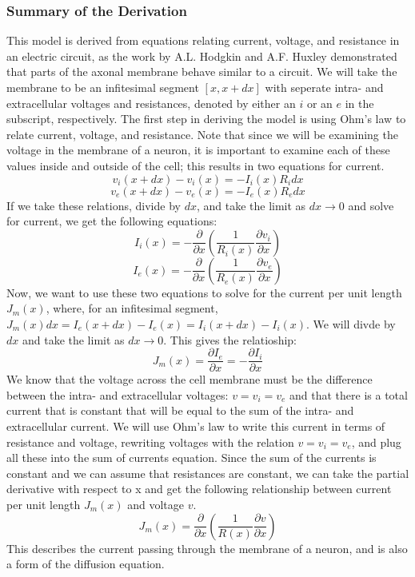 \documentclass[12pt]{article}
\begin{document}
\subsubsection{Summary of the Derivation}
This model is derived from equations relating current, voltage, and resistance in an electric circuit, as the work by A.L. Hodgkin and A.F. Huxley demonstrated that parts of the axonal membrane behave similar to a circuit. We will take the membrane to be an infitesimal segment $[x, x+dx]$ with seperate intra- and extracellular voltages and resistances, denoted by either an $i$ or an $e$ in the subscript, respectively. The first step in deriving the model is using Ohm's law to relate current, voltage, and resistance. Note that since we will be examining the voltage in the membrane of a neuron, it is important to examine each of these values inside and outside of the cell; this results in two equations for current. 
\[v_i(x+dx)-v_i(x)=-I_i(x)R_idx\]
\[v_e(x+dx)-v_e(x)=-I_e(x)R_edx\]
If we take these relations, divide by $dx$, and take the limit as $dx\rightarrow 0$ and solve for current, we get the following equations:
\[I_i(x)=-\frac{\partial}{\partial{x}}(\frac{1}{R_i(x)}\frac{\partial{v_i}}{\partial{x}})\]
\[I_e(x)=-\frac{\partial}{\partial{x}}(\frac{1}{R_e(x)}\frac{\partial{v_e}}{\partial{x}})\]
Now, we want to use these two equations to solve for the current per unit length $J_m(x)$, where, for an infitesimal segment, $J_m(x)dx=I_e(x+dx)-I_e(x)=I_i(x+dx)-I_i(x)$. We will divde by $dx$ and take the limit as $dx\rightarrow 0$. This gives the relatioship:
\[J_m(x)=\frac{\partial{I_e}}{\partial{x}}=-\frac{\partial{I_i}}{\partial{x}}\]
We know that the voltage across the cell membrane must be the difference between the intra- and extracellular voltages: $v=v_i=v_e$ and that there is a total current that is constant that will be equal to the sum of the intra- and extracellular current. We will use Ohm's law to write this current in terms of resistance and voltage, rewriting voltages with the relation $v=v_i=v_e$, and plug all these into the sum of currents equation. Since the sum of the currents is constant and we can assume that resistances are constant, we can take the partial derivative with respect to x and get the following relationship between current per unit length $J_m(x)$ and voltage $v$.
\begin{equation} \label{2}
J_m(x)=\frac{\partial}{\partial{x}}(\frac{1}{R(x)}\frac{\partial{v}}{\partial{x}})
\end {equation}
This describes the current passing through the membrane of a neuron, and is also a form of the diffusion equation.\par
\end{document}
